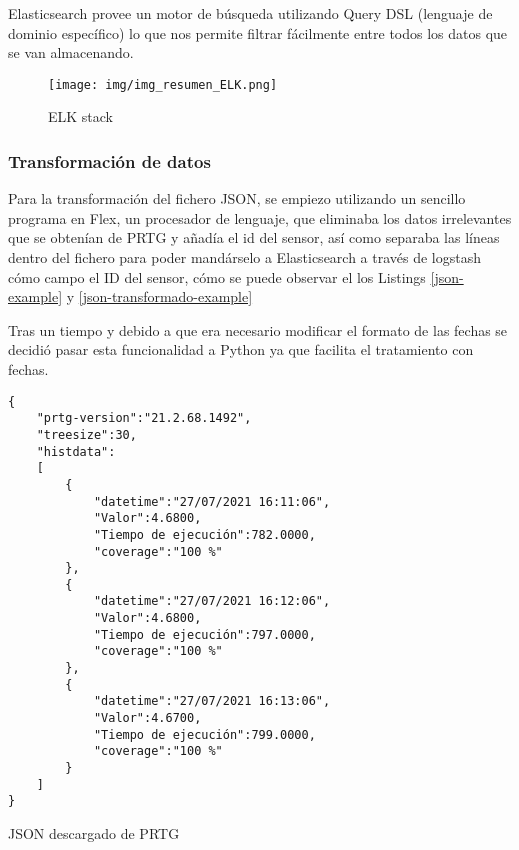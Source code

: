 Elasticsearch provee un motor de búsqueda utilizando Query DSL (lenguaje de dominio específico) lo que nos permite filtrar fácilmente entre todos los datos que se van almacenando.

\begin{figure}[h]
	\centering
	\texttt{[image: img/img\_resumen\_ELK.png]}
	\caption{ELK stack}
	\label{img_Consumo_Bomba_Agua}
\end{figure}

\subsubsection{Transformación de datos}\label{cap:TransformacionDatos}


Para la transformación del fichero JSON, se empiezo utilizando un sencillo programa en Flex, un procesador de lenguaje, que eliminaba los datos irrelevantes que se obtenían de PRTG y añadía el id del sensor, así como separaba las líneas dentro del fichero para poder mandárselo a Elasticsearch a través de logstash cómo campo el ID del sensor, cómo se puede observar el los Listings \ref{json-example} y \ref{json-transformado-example}

Tras un tiempo y debido a que era necesario modificar el formato de las fechas se decidió pasar esta funcionalidad a Python ya que facilita el tratamiento con fechas.


\begin{listing}
\begin{verbatim}
{
    "prtg-version":"21.2.68.1492",
    "treesize":30,
    "histdata":
    [
        {
            "datetime":"27/07/2021 16:11:06",
            "Valor":4.6800,
            "Tiempo de ejecución":782.0000,
            "coverage":"100 %"
        },
        {
            "datetime":"27/07/2021 16:12:06",
            "Valor":4.6800,
            "Tiempo de ejecución":797.0000,
            "coverage":"100 %"
        },
        {
            "datetime":"27/07/2021 16:13:06",
            "Valor":4.6700,
            "Tiempo de ejecución":799.0000,
            "coverage":"100 %"
        }
    ]
}

\end{verbatim}
\caption{JSON descargado de PRTG} 
\label{json-example}
\end{listing}

